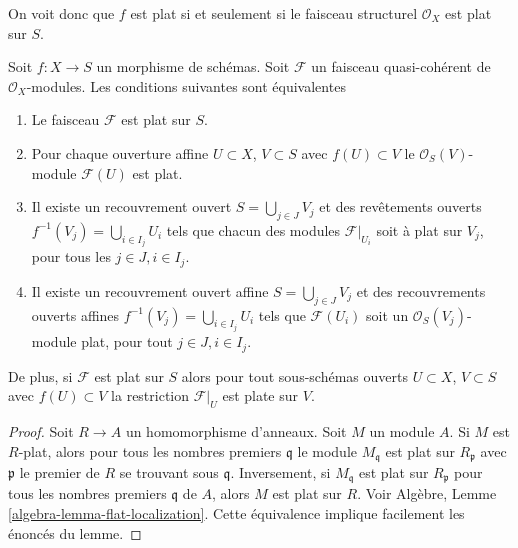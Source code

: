 \noindent
On voit donc que $f$ est plat si et seulement
si le faisceau structurel $\mathcal{O}_X$ est plat sur $S$.

\begin{lemma}
\label{lemma-flat-module-characterize}
Soit $f : X \to S$ un morphisme de schémas. Soit
$\mathcal{F}$ un faisceau quasi-cohérent de $\mathcal{O}_X$-modules. Les conditions
suivantes sont équivalentes
\begin{enumerate}
\item Le faisceau $\mathcal{F}$ est plat sur $S$.
\item Pour chaque ouverture affine $U \subset X$, $V \subset S$
avec $f(U) \subset V$ le $\mathcal{O}_S(V)$-module $\mathcal{F}(U)$ est plat.
\item Il existe un recouvrement ouvert $S = \bigcup_{j \in J} V_j$ et
des revêtements ouverts $f^{-1}(V_j) = \bigcup_{i \in I_j} U_i$ tels que chacun des
modules $\mathcal{F}|_{U_i}$ soit à plat sur $V_j$,
pour tous les $j\in J, i\in I_j$.
\item Il existe un recouvrement ouvert affine $S = \bigcup_{j \in J} V_j$
et des recouvrements ouverts affines $f^{-1}(V_j) = \bigcup_{i \in I_j} U_i$ tels
que $\mathcal{F}(U_i)$ soit un $\mathcal{O}_S(V_j)$-module plat, pour tout
$j\in J, i\in I_j$.
\end{enumerate}
De plus, si $\mathcal{F}$ est plat sur $S$ alors
pour tout sous-schémas ouverts $U \subset X$, $V \subset S$ avec $f(U) \subset V$ la
restriction $\mathcal{F}|_U$ est plate sur $V$.
\end{lemma}

\begin{proof}
Soit $R \to A$ un homomorphisme d'anneaux. Soit $M$
un module $A$. Si $M$ est $R$-plat,
alors pour tous les nombres premiers $\mathfrak q$ le module $M_{\mathfrak q}$
est plat sur $R_{\mathfrak p}$ avec $\mathfrak p$ le premier de $R$ se trouvant sous $\mathfrak q$.
Inversement, si $M_{\mathfrak q}$ est plat sur $R_{\mathfrak p}$ pour tous les nombres premiers
$\mathfrak q$ de $A$, alors $M$
est plat sur $R$. Voir Algèbre, Lemme \ref{algebra-lemma-flat-localization}.
Cette équivalence implique facilement les énoncés du lemme.
\end{proof}

